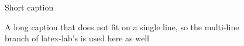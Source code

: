 \documentclass{article}
\begin{document}
\begin{figure}[h]
  \caption{Short caption}
\end{figure}
\begin{figure}[h]
  \caption{A long caption that does not fit on a single line, so the multi-line
    branch of latex-lab's \texttt{\string\@makecaption} is used here as well}
\end{figure}
\end{document}
